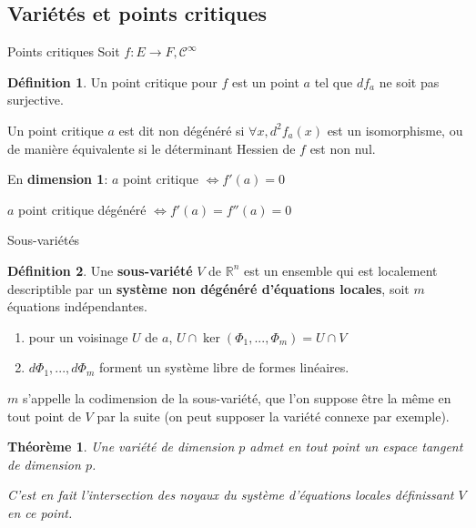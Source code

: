 \documentclass[compress]{beamer}
\newcommand{\cinf}{\mathcal{C}^\infty}
\newcommand{\R}{\mathbb{R}}
\newtheorem{thm}{Théorème}
\theoremstyle{definition}
\newtheorem{defn}{Définition}
\begin{document}
\subsection{Variétés et points critiques}
\begin{frame}{Points critiques}
    Soit $f: E \to F, \cinf$
    \begin{defn}
        Un point critique pour $f$ est un point $a$ tel que $df_a$ ne soit pas surjective.

	    Un point critique $a$ est dit non dégénéré si $\forall x, d^2f_a(x)$ est un isomorphisme, ou de manière équivalente si le déterminant Hessien de $f$ est non nul.
    \end{defn}
    \pause
    En \textbf{dimension 1}: $a$ point critique $\iff f'(a) = 0$

    $a$ point critique dégénéré $\iff f'(a) =f''(a) = 0$
\end{frame}

\begin{frame}{Sous-variétés}
    \begin{defn}
        Une \textbf{sous-variété} $V$ de $\R^n$ est un ensemble qui est localement descriptible par un \textbf{système non dégénéré d'équations locales}, soit $m$ équations indépendantes.
        \begin{enumerate}[<+->]
            \item pour un voisinage $U$ de $a$, $U\cap\ker(\Phi_1,...,\Phi_m)=U\cap V$
            \item $d\Phi_1,...,d\Phi_m$ forment un système libre de formes linéaires.
        \end{enumerate}
        \pause[3]
        $m$ s'appelle la codimension de la sous-variété, que l'on suppose être la même en tout point de $V$ par la suite (on peut supposer la variété connexe par exemple).
    \end{defn}
    \pause[4]
    \begin{thm}
        Une variété de dimension $p$ admet en tout point un espace tangent de dimension $p$.

        C'est en fait l'intersection des noyaux du système d'équations locales définissant $V$ en ce point.
    \end{thm}
\end{frame}
\end{document}
